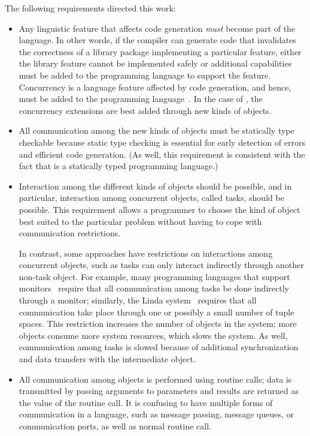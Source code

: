 \documentclass[openright,twoside]{report}
\begin{document}
The following requirements directed this work:
\begin{itemize}
\item
Any linguistic feature that affects code generation \emph{must} become part of the language.
In other words, if the compiler can generate code that invalidates the correctness of a library package implementing a particular feature, either the library feature cannot be implemented safely or additional capabilities must be added to the programming language to support the feature.
Concurrency is a language feature affected by code generation, and hence, must be added to the programming language~\cite{Buhr95a}.
In the case of \CC, the concurrency extensions are best added through new kinds of objects.

\item
All communication among the new kinds of objects must be statically type checkable because static type checking is essential for early detection of errors and efficient code generation.
(As well, this requirement is consistent with the fact that \CC is a statically typed programming language.)

\item
Interaction among the different kinds of objects should be possible, and in particular, interaction among concurrent objects, called tasks, should be possible.
This requirement allows a programmer to choose the kind of object best suited to the particular problem without having to cope with communication restrictions.

In contrast, some approaches have restrictions on interactions among concurrent objects, such as tasks can only interact indirectly through another non-task object.
For example, many programming languages that support monitors~\cite{ConcurrentPascal,Mesa,Turing} require that all communication among tasks be done indirectly through a monitor;
similarly, the Linda system~\cite{Linda} requires that all communication take place through one or possibly a small number of tuple spaces.
This restriction increases the number of objects in the system;
more objects consume more system resources, which slows the system.
As well, communication among tasks is slowed because of additional synchronization and data transfers with the intermediate object.

\item
All communication among objects is performed using routine calls;
data is transmitted by passing arguments to parameters and results are returned as the value of the routine call.
It is confusing to have multiple forms of communication in a language, such as message passing, message queues, or communication ports, as well as normal routine call.


\end{itemize}
\end{document}
